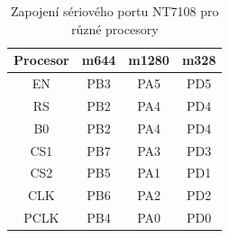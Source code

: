 \begin{table}[H]
  \begin{center}
    \begin{tabular}{| c || c | c | c |}
    \hline
 Procesor  & m644  &  m1280  & m328 \\
    \hline
    \hline
  EN        &  PB3  &  PA5   & PD5     \\
    \hline
  RS        &  PB2  &  PA4   & PD4      \\
  B0        &  PB2  &  PA4   & PD4      \\
    \hline
  CS1       &  PB7  &  PA3   & PD3      \\
    \hline
  CS2       &  PB5  &  PA1   & PD1      \\
    \hline
  CLK       &  PB6  &  PA2   & PD2      \\
    \hline
  PCLK      &  PB4  &  PA0   & PD0      \\
    \hline
    \end{tabular}
  \end{center}
  \caption{Zapojení sériového portu NT7108 pro různé procesory}
  \label{tab:7108-processor}
\end{table}

